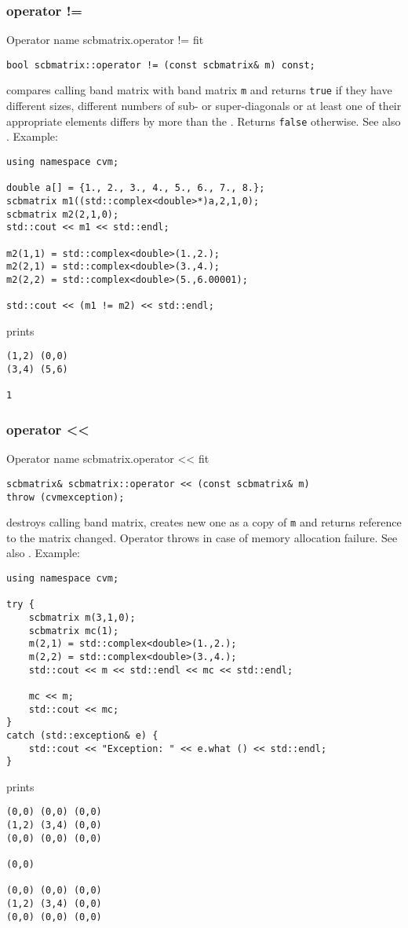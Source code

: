 \subsubsection{operator !=}
Operator%
\pdfdest name {scbmatrix.operator !=} fit
\begin{verbatim}
bool scbmatrix::operator != (const scbmatrix& m) const;
\end{verbatim}
compares  calling band matrix with  band matrix \verb"m"
and returns \verb"true" if they have different sizes,
different numbers of sub- or super-diagonals
or at least one of their appropriate elements
differs by more than the
.
Returns \verb"false" otherwise.
See also .
Example:
\begin{Verbatim}
using namespace cvm;

double a[] = {1., 2., 3., 4., 5., 6., 7., 8.};
scbmatrix m1((std::complex<double>*)a,2,1,0);
scbmatrix m2(2,1,0);
std::cout << m1 << std::endl;

m2(1,1) = std::complex<double>(1.,2.); 
m2(2,1) = std::complex<double>(3.,4.); 
m2(2,2) = std::complex<double>(5.,6.00001);

std::cout << (m1 != m2) << std::endl;
\end{Verbatim}
prints
\begin{Verbatim}
(1,2) (0,0)
(3,4) (5,6)

1
\end{Verbatim}
\newpage




\subsubsection{operator <{}<}
Operator%
\pdfdest name {scbmatrix.operator <<} fit
\begin{verbatim}
scbmatrix& scbmatrix::operator << (const scbmatrix& m)
throw (cvmexception);
\end{verbatim}
destroys  calling band matrix, creates  new one as a copy of \verb"m"
and returns  reference to
the matrix changed.
Operator throws  
in case of memory allocation failure.
See also .
Example:
\begin{Verbatim}
using namespace cvm;

try {
    scbmatrix m(3,1,0);
    scbmatrix mc(1);
    m(2,1) = std::complex<double>(1.,2.);
    m(2,2) = std::complex<double>(3.,4.);
    std::cout << m << std::endl << mc << std::endl;

    mc << m;
    std::cout << mc;
}
catch (std::exception& e) {
    std::cout << "Exception: " << e.what () << std::endl;
}
\end{Verbatim}
prints
\begin{Verbatim}
(0,0) (0,0) (0,0)
(1,2) (3,4) (0,0)
(0,0) (0,0) (0,0)

(0,0)

(0,0) (0,0) (0,0)
(1,2) (3,4) (0,0)
(0,0) (0,0) (0,0)
\end{Verbatim}
\newpage



